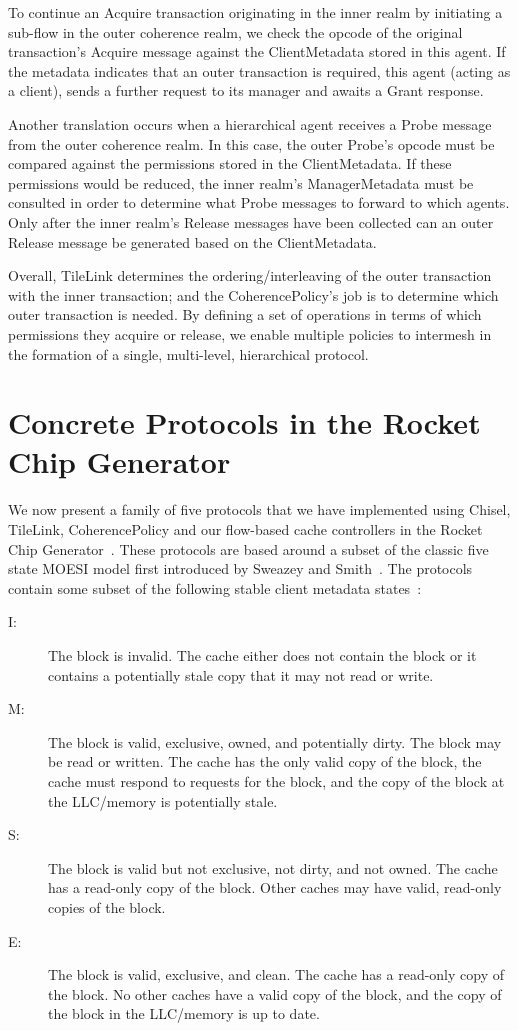 To continue an Acquire transaction originating in the inner realm
by initiating a sub-flow in the outer coherence realm, we check the opcode
of the original transaction's Acquire message against the ClientMetadata stored in this agent.
If the metadata indicates that an outer transaction is required, this agent (acting as a client),
sends a further request to its manager and awaits a Grant response.

Another translation occurs when a hierarchical agent receives a Probe message from
the outer coherence realm.
In this case, the outer Probe's opcode must be compared against the permissions stored in the ClientMetadata.
If these permissions would be reduced, the inner realm's ManagerMetadata must be consulted in order
to determine what Probe messages to forward to which agents.
Only after the inner realm's Release messages have been collected can an outer Release message be generated
based on the ClientMetadata.

Overall, TileLink determines the ordering/interleaving of the outer transaction with the inner transaction;
and the CoherencePolicy's job is to determine which outer transaction is needed.
By defining a set of operations in terms of which permissions they acquire or release,
we enable multiple policies to intermesh in the formation of a single, multi-level, hierarchical protocol.


\section{Concrete Protocols in the Rocket Chip Generator}

We now present a family of five protocols that we have implemented using Chisel, TileLink, CoherencePolicy
and our flow-based cache controllers in the Rocket Chip Generator~\cite{rocket}.
These protocols are based around a subset of the classic five state MOESI model
first introduced by Sweazey and Smith~\cite{sweazey1986class}.
The protocols contain some subset of the following stable client metadata states~\cite{sorin2011primer}:
\begin{description}
\item[I:] The block is invalid. The cache either does not contain the block or it contains a potentially stale copy that it may not read or write.
\item[M:] The block is valid, exclusive, owned, and potentially dirty. The block may be
read or written. The cache has the only valid copy of the block, the cache must respond to
requests for the block, and the copy of the block at the LLC/memory is potentially stale. 
\item[S:] The block is valid but not exclusive, not dirty, and not owned. The cache has a read-only copy of the block. Other caches may have valid, read-only copies of the block.
\item[E:] The block is valid, exclusive, and clean. The cache has a read-only copy of the
block. No other caches have a valid copy of the block, and the copy of the block in the
LLC/memory is up to date. 
\end{description}

